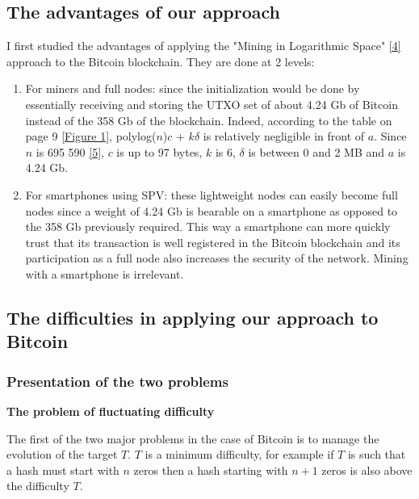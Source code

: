 \documentclass[12pt,a4paper]{article}
\newcommand{\source}[1]{\hyperlink{#1}{[#1]}}
\newcommand{\annexe}[2]{\hyperlink{#1}{[Figure #2]}}
\begin{document}
	\subsection{The advantages of our approach}
	
	I first studied the advantages of applying the "Mining in Logarithmic Space" \source{4} approach to the Bitcoin blockchain. They are done at 2 levels:\\
	\begin{enumerate}
	\item For miners and full nodes: since the initialization would be done by essentially receiving and storing the UTXO set of about 4.24 Gb of Bitcoin instead of the 358 Gb of the blockchain. Indeed, according to the table on page 9 \annexe{21}{1}, polylog($n$)$c$ + $k\delta$ is relatively negligible in front of $a$. Since $n$ is 695 590 \source{5}, $c$ is up to 97 bytes, $k$ is 6, $\delta$ is between 0 and 2 MB and $a$ is 4.24 Gb.
	
	\item For smartphones using SPV: these lightweight nodes can easily become full nodes since a weight of 4.24 Gb is bearable on a smartphone as opposed to the 358 Gb previously required. This way a smartphone can more quickly trust that its transaction is well registered in the Bitcoin blockchain and its participation as a full node also increases the security of the network.
	Mining with a smartphone is irrelevant.
	\end{enumerate}
	
	\subsection{The difficulties in applying our approach to Bitcoin}
	
	\subsubsection{Presentation of the two problems}
	
	\textbf{The problem of fluctuating difficulty\\}
	
	The first of the two major problems in the case of Bitcoin is to manage the evolution of the target $T$. $T$ is a minimum difficulty, for example if $T$ is such that a hash must start with $n$ zeros then a hash starting with $n + 1$ zeros is also above the difficulty $T$.
	
\end{document}
